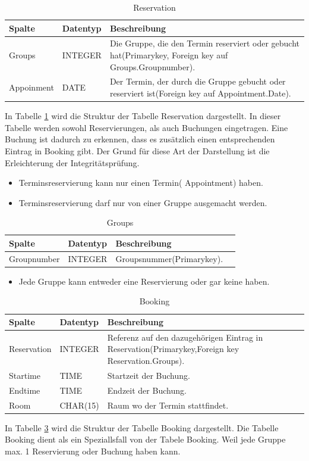 \documentclass[10pt,a4paper]{article}
\begin{document}
\begin{table}[h]
\centering
	\caption{Reservation}
	\label{tab:Reservation}
    \begin{tabular}{| l | l | l |}
    \hline
    \rowcolor{lightgray} Spalte & Datentyp & Beschreibung  \\ \hline
    Groups & INTEGER & Die Gruppe, die den Termin reserviert oder gebucht hat(Primarykey, Foreign key auf Groups.Groupnumber).  \\ \hline
    Appoinment & DATE & Der Termin, der durch die Gruppe gebucht oder reserviert ist(Foreign key auf Appointment.Date). \\ \hline
    \end{tabular}
\end{table}
In Tabelle \ref{tab:Reservation} wird die Struktur der Tabelle Reservation  dargestellt.  In dieser Tabelle werden sowohl Reservierungen, als auch Buchungen eingetragen. Eine Buchung ist dadurch zu erkennen, dass es zusätzlich einen entsprechenden Eintrag in Booking gibt. Der Grund für diese Art der Darstellung ist die Erleichterung der Integritätsprüfung.

\begin{itemize} 
\item Terminsreservierung kann nur einen Termin( Appointment) haben.
\item Terminsreservierung darf nur von einer Gruppe ausgemacht werden.
\end{itemize}
\begin{table}[h]
\centering
\caption{Groups}
    \label{tab:Groups}    
    \begin{tabular}{| l | l | l | l |}
    \hline
    \rowcolor{lightgray} Spalte & Datentyp & Beschreibung  \\ \hline
    Groupnumber & INTEGER & Groupsnummer(Primarykey).  \\ \hline
   \end{tabular}
\end{table}

\begin{itemize}
\item Jede Gruppe kann entweder eine Reservierung oder gar keine haben. 

\end{itemize}


\begin{table}[h]
\centering
\caption{Booking}
	\label{tab:Booking}
    \begin{tabular}{| l | l | l | l |}
    \hline
    \rowcolor{lightgray} Spalte & Datentyp & Beschreibung  \\ \hline
    Reservation  & INTEGER & Referenz auf den dazugehörigen Eintrag in Reservation(Primarykey,Foreign key Reservation.Groups). \\ \hline
    Startime & TIME & Startzeit der Buchung. \\ \hline
    Endtime & TIME & Endzeit der Buchung. \\ \hline
    Room & CHAR(15) & Raum wo der Termin stattfindet. \\ \hline
    \end{tabular}
\end{table}

In Tabelle \ref{tab:Booking} wird die Struktur der Tabelle Booking dargestellt. Die Tabelle Booking dient als ein Speziallsfall von der Tabele Booking. Weil jede Gruppe max. 1 Reservierung oder Buchung haben kann.
\end{document}
